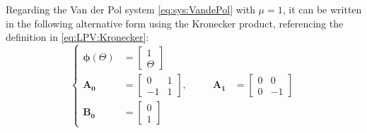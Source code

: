 Regarding the Van der Pol system \eqref{eq:sys:VandePol} with $\mu=1$, it can be written in the following alternative form using the Kronecker product, referencing the definition in \eqref{eq:LPV:Kronecker}:
\begin{equation}
   \left \{ \begin{aligned}
        \boldsymbol{\phi}(\Theta) &= 
        \begin{bmatrix}
         1 \\ \Theta   
        \end{bmatrix}\\
        \mathbf{A_0} &=
        \begin{bmatrix}
            0 & 1\\
            -1 & 1
        \end{bmatrix}, &\quad &
        \mathbf{A_1} &=
        \begin{bmatrix}
            0 & 0\\
            0 & -1
        \end{bmatrix}\\
        \mathbf{B_0} &=
        \begin{bmatrix}
        0\\
        1
    \end{bmatrix}
    \end{aligned} \right .
\end{equation}


